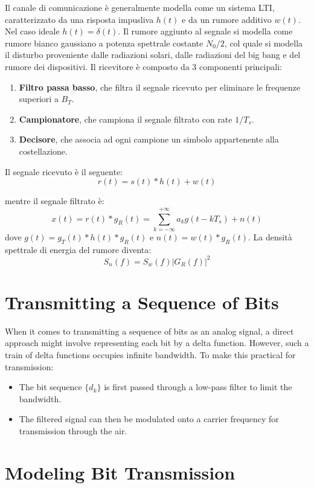 Il canale di comunicazione è generalmente modella come un sistema LTI, caratterizzato da una risposta impusliva $h(t)$ e da un rumore additivo $w(t)$.
Nel caso ideale $h(t) = \delta (t)$.
Il rumore aggiunto al segnale si modella come rumore bianco gaussiano a potenza spettrale costante $N_0/2$, col quale si modella il disturbo proveniente dalle radiazioni solari, dalle radiazioni del big bang e del rumore dei dispositivi.
Il ricevitore è composto da 3 componenti principali:
\begin{enumerate}
    \item \textbf{Filtro passa basso}, che filtra il segnale ricevuto per eliminare le frequenze superiori a $B_T$.
    \item \textbf{Campionatore}, che campiona il segnale filtrato con rate $1/T_s$. 
    \item \textbf{Decisore}, che associa ad ogni campione un simbolo appartenente alla costellazione.
\end{enumerate}
Il segnale ricevuto è il seguente:
\[
    r(t) = s(t) \ast h(t) + w(t)
\]

mentre il segnale filtrato è:
\[
    x(t) = r(t) \ast g_R(t) = \sum_{k=-\infty}^{+\infty} a_k g(t - kT_s) + n(t)
\]
dove $g(t) = g_T(t) \ast h(t) \ast g_R(t)$ e $n(t) = w(t) \ast g_R(t)$. La densità spettrale di energia del rumore diventa:
\[
    S_n(f) = S_w(f) |G_R(f)|^2
\]


\section*{Transmitting a Sequence of Bits}

When it comes to transmitting a sequence of bits as an analog signal, a direct approach might involve representing each bit by a delta function. However, such a train of delta functions occupies infinite bandwidth. To make this practical for transmission:

\begin{itemize}
    \item The bit sequence \( \{d_k\} \) is first passed through a low-pass filter to limit the bandwidth.
    \item The filtered signal can then be modulated onto a carrier frequency for transmission through the air.
\end{itemize}

\section*{Modeling Bit Transmission}

